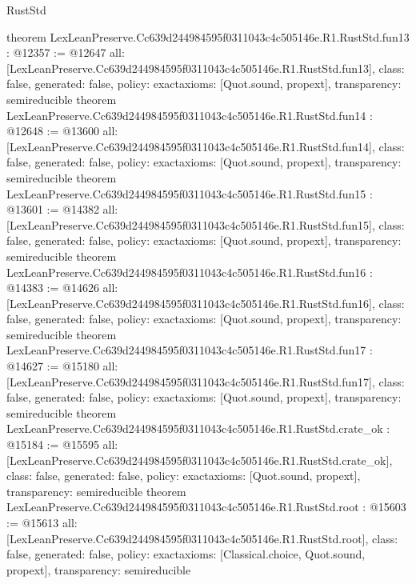 \begin{lexlean}{RustStd}
\begin{coremodule}
{}
theorem LexLeanPreserve.Cc639d244984595f0311043c4c505146e.R1.RustStd.fun13 : @12357 := @12647 {
  all: [LexLeanPreserve.Cc639d244984595f0311043c4c505146e.R1.RustStd.fun13],
  class: false,
  generated: false,
  policy: exact{axioms: [Quot.sound, propext]},
  transparency: semireducible
}
theorem LexLeanPreserve.Cc639d244984595f0311043c4c505146e.R1.RustStd.fun14 : @12648 := @13600 {
  all: [LexLeanPreserve.Cc639d244984595f0311043c4c505146e.R1.RustStd.fun14],
  class: false,
  generated: false,
  policy: exact{axioms: [Quot.sound, propext]},
  transparency: semireducible
}
theorem LexLeanPreserve.Cc639d244984595f0311043c4c505146e.R1.RustStd.fun15 : @13601 := @14382 {
  all: [LexLeanPreserve.Cc639d244984595f0311043c4c505146e.R1.RustStd.fun15],
  class: false,
  generated: false,
  policy: exact{axioms: [Quot.sound, propext]},
  transparency: semireducible
}
theorem LexLeanPreserve.Cc639d244984595f0311043c4c505146e.R1.RustStd.fun16 : @14383 := @14626 {
  all: [LexLeanPreserve.Cc639d244984595f0311043c4c505146e.R1.RustStd.fun16],
  class: false,
  generated: false,
  policy: exact{axioms: [Quot.sound, propext]},
  transparency: semireducible
}
theorem LexLeanPreserve.Cc639d244984595f0311043c4c505146e.R1.RustStd.fun17 : @14627 := @15180 {
  all: [LexLeanPreserve.Cc639d244984595f0311043c4c505146e.R1.RustStd.fun17],
  class: false,
  generated: false,
  policy: exact{axioms: [Quot.sound, propext]},
  transparency: semireducible
}
theorem LexLeanPreserve.Cc639d244984595f0311043c4c505146e.R1.RustStd.crate_ok : @15184 := @15595 {
  all: [LexLeanPreserve.Cc639d244984595f0311043c4c505146e.R1.RustStd.crate_ok],
  class: false,
  generated: false,
  policy: exact{axioms: [Quot.sound, propext]},
  transparency: semireducible
}
theorem LexLeanPreserve.Cc639d244984595f0311043c4c505146e.R1.RustStd.root : @15603 := @15613 {
  all: [LexLeanPreserve.Cc639d244984595f0311043c4c505146e.R1.RustStd.root],
  class: false,
  generated: false,
  policy: exact{axioms: [Classical.choice, Quot.sound, propext]},
  transparency: semireducible
}


\end{coremodule}
\end{lexlean}
